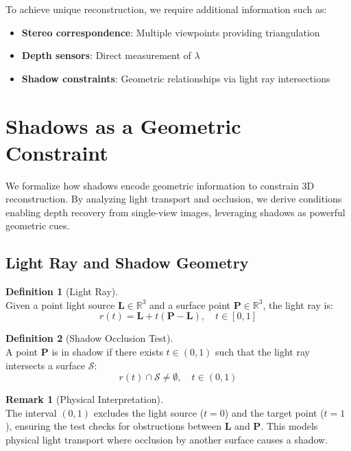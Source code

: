 \documentclass[12pt]{article}
\newcommand{\R}{\mathbb{R}}
\newcommand{\vect}[1]{\bm{#1}}
\theoremstyle{definition}
\newtheorem{definition}{Definition}[subsection]
\newtheorem{remark}{Remark}[subsection]
\begin{document}
To achieve unique reconstruction, we require additional information such as:
\begin{itemize}
    \item \textbf{Stereo correspondence}: Multiple viewpoints providing triangulation
    \item \textbf{Depth sensors}: Direct measurement of $\lambda$
    \item \textbf{Shadow constraints}: Geometric relationships via light ray intersections
\end{itemize}

\section{Shadows as a Geometric Constraint}

We formalize how shadows encode geometric information to constrain 3D reconstruction. By analyzing light transport and occlusion, we derive conditions enabling depth recovery from single-view images, leveraging shadows as powerful geometric cues.

\subsection{Light Ray and Shadow Geometry}

\begin{definition}[Light Ray] ~\\
Given a point light source $\vect{L} \in \R^3$ and a surface point $\vect{P} \in \R^3$, the light ray is:
\begin{equation}
\boxed{r(t) = \vect{L} + t(\vect{P} - \vect{L}), \quad t \in [0,1]} \label{eq:light_ray}
\end{equation}
\end{definition}

\begin{definition}[Shadow Occlusion Test] ~\\
A point $\vect{P}$ is in shadow if there exists $t \in (0,1)$ such that the light ray intersects a surface $\mathcal{S}$:
\begin{equation}
\boxed{r(t) \cap \mathcal{S} \neq \emptyset, \quad t \in (0,1)}
\end{equation}
\end{definition}

\begin{remark}[Physical Interpretation] ~\\
The interval $(0,1)$ excludes the light source ($t=0$) and the target point ($t=1$), ensuring the test checks for obstructions between $\vect{L}$ and $\vect{P}$. This models physical light transport where occlusion by another surface causes a shadow.
\end{remark}
\end{document}
